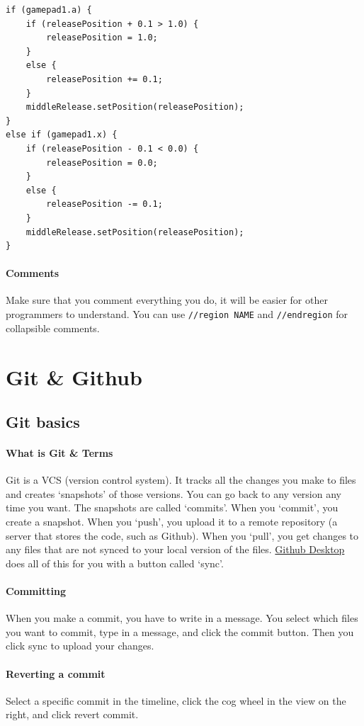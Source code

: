 \documentclass[12p,a4paper]{article}
\begin{document}
\begin{verbatim}
if (gamepad1.a) {
	if (releasePosition + 0.1 > 1.0) {
		releasePosition = 1.0;
	} 
	else {
		releasePosition += 0.1;
	}
	middleRelease.setPosition(releasePosition);
} 
else if (gamepad1.x) {
	if (releasePosition - 0.1 < 0.0) {
		releasePosition = 0.0;
	} 
	else {
		releasePosition -= 0.1;
	}
	middleRelease.setPosition(releasePosition);
}
\end{verbatim}

\paragraph{Comments} Make sure that you comment everything you do, it will be easier for other programmers to understand. You can use \verb!//region NAME! and \verb!//endregion! for collapsible comments.

\section{Git \& Github}
\subsection{Git basics}

\paragraph{What is Git \& Terms} Git is a VCS (version control system). It tracks all the changes you make to files and creates `snapshots' of those versions. You can go back to any version any time you want. The snapshots are called `commits'. When you `commit', you create a snapshot. When you `push', you upload it to a remote repository (a server that stores the code, such as Github). When you `pull', you get changes to any files that are not synced to your local version of the files. \href{https://desktop.github.com}{Github Desktop} does all of this for you with a button called `sync'. 

\paragraph{Committing} When you make a commit, you have to write in a message. You select which files you want to commit, type in a message, and click the commit button. Then you click sync to upload your changes.

\paragraph{Reverting a commit} Select a specific commit in the timeline, click the cog wheel in the view on the right, and click revert commit.
\end{document}
